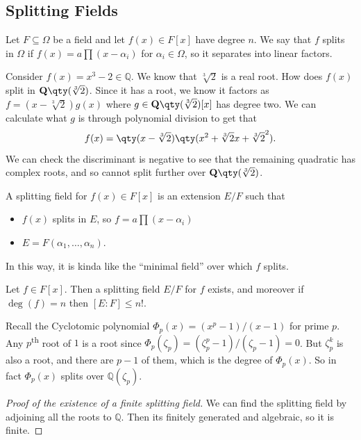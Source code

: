 \subsection{Splitting Fields}
Let $F \subseteq \Omega$ be a field and let $f(x) \in F[x]$ have degree $n$. We say that $f$ splits in $\Omega$ if $f(x) = a \prod (x-\alpha_i)$ for $\alpha_i \in \Omega$, so it separates into linear factors.

\begin{example}
Consider $f(x) = x^3 - 2 \in \mathbb{Q}$. We know that $\sqrt[3]{2}$ is a real root. How does $f(x)$ split in $\mathbb{Q}\qty(\sqrt[3]{2})$. Since it has a root, we know it factors as $f = (x-\sqrt[3]{2})g(x)$ where $g \in \mathbb{Q}\qty(\sqrt[3]{2})[x]$ has degree two. We can calculate what $g$ is through polynomial division to get that
\[ f(x) = \qty(x-\sqrt[3]{2})\qty(x^2 + \sqrt[3]{2}x + \sqrt[3]{2}^2). \]
We can check the discriminant is negative to see that the remaining quadratic has complex roots, and so cannot split further over $\mathbb{Q}\qty(\sqrt[3]{2})$.
\end{example} 

\begin{definition}
A splitting field for $f(x) \in F[x]$ is an extension $E/F$ such that 
\begin{itemize}
\item $f(x)$ splits in $E$, so $f = a\prod (x-\alpha_i)$
\item $E = F(\alpha_1, \dotsc, \alpha_n)$.
\end{itemize}
In this way, it is kinda like the ``minimal field'' over which $f$ splits.
\end{definition}

\begin{theorem}
Let $f \in F[x]$. Then a splitting field $E/F$ for $f$ exists, and moreover if $\deg(f) = n$ then $[E:F] \leq n!$.
\end{theorem}

\begin{example}
Recall the Cyclotomic polynomial $\Phi_p(x) = (x^p-1)/(x-1)$ for prime $p$. Any $p$\textsuperscript{th} root of $1$ is a root since $\Phi_p(\zeta_p) = (\zeta_p^p-1)/(\zeta_p-1) = 0$. But $\zeta_p^k$ is also a root, and there are $p-1$ of them, which is the degree of $\Phi_p(x)$. So in fact $\Phi_p(x)$ splits over $\mathbb{Q}(\zeta_p)$.
\end{example}

\begin{proof}[Proof of the existence of a finite splitting field]
We can find the splitting field by adjoining all the roots to $\mathbb{Q}$. Then its finitely generated and algebraic, so it is finite.
\end{proof}

